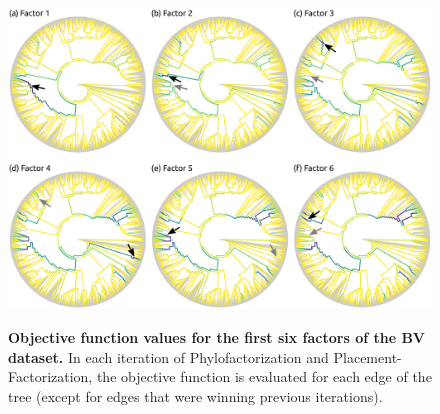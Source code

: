 \begin{figure}[!htb]
    \centering
     \includegraphics[width=\linewidth]{pdf/pf_bv_place_no_tw_ovs.pdf}
    \begin{subfigure}{0pt}
        \label{supp:fig:pf_bv_place_no_tw_ovs:sub:factor_1}
    \end{subfigure}
    \begin{subfigure}{0pt}
        \label{supp:fig:pf_bv_place_no_tw_ovs:sub:factor_2}
    \end{subfigure}
    \begin{subfigure}{0pt}
        \label{supp:fig:pf_bv_place_no_tw_ovs:sub:factor_3}
    \end{subfigure}
    \begin{subfigure}{0pt}
        \label{supp:fig:pf_bv_place_no_tw_ovs:sub:factor_4}
    \end{subfigure}
    \begin{subfigure}{0pt}
        \label{supp:fig:pf_bv_place_no_tw_ovs:sub:factor_5}
    \end{subfigure}
    \begin{subfigure}{0pt}
        \label{supp:fig:pf_bv_place_no_tw_ovs:sub:factor_6}
    \end{subfigure}
    \caption{
        \textbf{Objective function values for the first six factors of the \ac{BV} dataset.}
        In each iteration of Phylofactorization and Placement-Factorization, the objective function is evaluated
        for each edge of the tree (except for edges that were winning previous iterations).
}
\end{figure}
